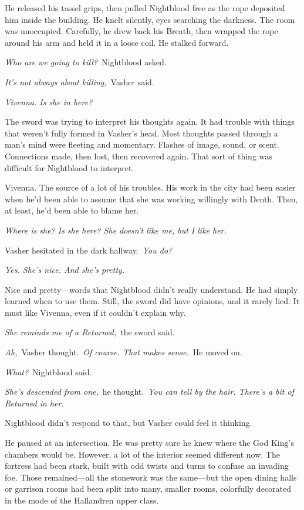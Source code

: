 He released his tassel grips, then pulled Nightblood free as the rope deposited him inside the building. He knelt silently, eyes searching the darkness. The room was unoccupied. Carefully, he drew back his Breath, then wrapped the rope around his arm and held it in a loose coil. He stalked forward.

\textit{Who are we going to kill?}~Nightblood asked.

\textit{It’s not always about killing,}~Vasher said.

\textit{Vivenna. Is she in here?}

The sword was trying to interpret his thoughts again. It had trouble with things that weren’t fully formed in Vasher’s head. Most thoughts passed through a man’s mind were fleeting and momentary. Flashes of image, sound, or scent. Connections made, then lost, then recovered again. That sort of thing was difficult for Nightblood to interpret.

Vivenna. The source of a lot of his troubles. His work in the city had been easier when he’d been able to assume that she was working willingly with Denth. Then, at least, he’d been able to blame her.

\textit{Where is she? Is she here? She doesn’t like me, but I like her.}

Vasher hesitated in the dark hallway.~\textit{You do?}

\textit{Yes. She’s nice. And she’s pretty.}

Nice and pretty—words that Nightblood didn’t really understand. He had simply learned when to use them. Still, the sword did have opinions, and it rarely lied. It must like Vivenna, even if it couldn’t explain why.

\textit{She reminds me of a Returned,}~the sword said.

\textit{Ah,}~Vasher thought.~\textit{Of course. That makes sense.}~He moved on.

\textit{What?}~Nightblood said.

\textit{She’s descended from one,}~he thought.~\textit{You can tell by the hair. There’s a bit of Returned in her.}

Nightblood didn’t respond to that, but Vasher could feel it thinking.

He paused at an intersection. He was pretty sure he knew where the God King’s chambers would be. However, a lot of the interior seemed different now. The fortress had been stark, built with odd twists and turns to confuse an invading foe. Those remained—all the stonework was the same—but the open dining halls or garrison rooms had been split into many, smaller rooms, colorfully decorated in the mode of the Hallandren upper class.

